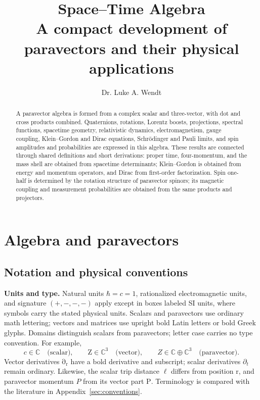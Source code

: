 \documentclass[11pt]{article}
\title{\textbf{Space--Time Algebra}\\[0.35em]
  \large A compact development of paravectors and their physical applications}
\author{Dr. Luke A. Wendt}
\date{}
\newcommand{\pv}[1]{{#1}}
\newcommand{\vstyle}[1]{{\bm{\mathrm{#1}}}}
\newcommand{\pP}{\pv{P}}
\newcommand{\pZ}{\pv{Z}}
\numberwithin{equation}{section}
\newcommand{\C}{\mathbb{C}}
\newcommand{\bZ}{\vstyle{Z}}
\newcommand{\br}{\vstyle{r}}
\newcommand{\bp}{\vstyle{P}}
\newcommand{\pdr}{\vstyle{\partial}_{\br}}
\begin{document}
\maketitle
\thispagestyle{empty}

\begin{abstract}
A paravector algebra is formed from a complex scalar and three-vector,
with dot and cross products combined. Quaternions, rotations, Lorentz
boosts, projections, spectral functions, spacetime geometry, relativistic
dynamics, electromagnetism, gauge coupling, Klein--Gordon and Dirac
equations, Schr\"odinger and Pauli limits, and spin amplitudes and
probabilities are expressed in this algebra. These results are connected
through shared definitions and short derivations: proper time,
four-momentum, and the mass shell are obtained from spacetime determinants;
Klein--Gordon is obtained from energy and momentum operators, and Dirac
from first-order factorization. Spin one-half is determined by the rotation
structure of paravector spinors; its magnetic coupling and measurement
probabilities are obtained from the same products and projectors.
\end{abstract}

\clearpage
\begingroup
\setlength{\parskip}{0pt}
\tableofcontents
\endgroup
\clearpage
{}

\section{Algebra and paravectors}
\label{sec:algebra}

\subsection{Notation and physical conventions}

\textbf{Units and type.}
Natural units $\hbar=c=1$, rationalized electromagnetic units, and
signature $(+,-,-,-)$ apply except in boxes labeled SI units, where
symbols carry the stated physical units. Scalars and paravectors use
ordinary math lettering; vectors and matrices use upright bold Latin
letters or bold Greek glyphs. Domains distinguish scalars from
paravectors; letter case carries no type convention. For example,
\[
 c\in\C\quad\text{(scalar)},\qquad
 \bZ\in\C^3\quad\text{(vector)},\qquad
 \pZ\in\C\oplus\C^3\quad\text{(paravector)}.
\]
Vector derivatives $\pdr$ have a bold derivative and subscript;
scalar derivatives $\partial_t$ remain ordinary. Likewise, the scalar
trip distance $\ell$ differs from position $\br$, and paravector momentum
$\pP$ from its vector part $\bp$. Terminology is compared with the
literature in Appendix~\ref{sec:conventions}.
\end{document}

